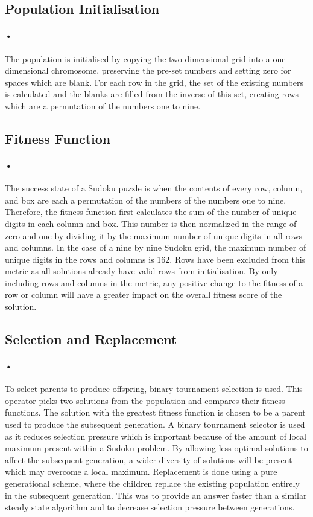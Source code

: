 \documentclass[10pt]{article}
\begin{document}
\subsection{Population Initialisation}
\paragraph{•}
The population is initialised by copying the two-dimensional grid into a one dimensional chromosome, preserving the pre-set numbers and setting zero for spaces which are blank. For each row in the grid, the set of the existing numbers is calculated and the blanks are filled from the inverse of this set, creating rows which are a permutation of the numbers one to nine.

\subsection{Fitness Function}
\paragraph{•}
The success state of a Sudoku puzzle is when the contents of every row, column, and box are each a permutation of the numbers of the numbers one to nine. Therefore, the fitness function first calculates the sum of the number of unique digits in each column and box. This number is then normalized in the range of zero and one by dividing it by the maximum number of unique digits in all rows and columns. In the case of a nine by nine Sudoku grid, the maximum number of unique digits in the rows and columns is 162. Rows have been excluded from this metric as all solutions already have valid rows from initialisation. By only including rows and columns in the metric, any positive change to the fitness of a row or column will have a greater impact on the overall fitness score of the solution.

\subsection{Selection and Replacement}
\paragraph{•}
To select parents to produce offspring, binary tournament selection is used. This operator picks two solutions from the population and compares their fitness functions. The solution with the greatest fitness function is chosen to be a parent used to produce the subsequent generation. A binary tournament selector is used as it reduces selection pressure which is important because of the amount of local maximum present within a Sudoku problem. By allowing less optimal solutions to affect the subsequent generation, a wider diversity of solutions will be present which may overcome a local maximum. Replacement is done using a pure generational scheme, where the children replace the existing population entirely in the subsequent generation. This was to provide an answer faster than a similar steady state algorithm and to decrease selection pressure between generations.
\end{document}
